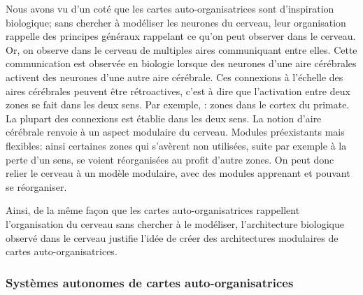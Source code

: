 \documentclass[../main]{subfiles}
\begin{document}
Nous avons vu d'un coté que les cartes auto-organisatrices sont d'inspiration biologique; sans chercher à modéliser les neurones du cerveau, leur organisation rappelle des principes généraux rappelant ce qu'on peut observer dans le cerveau. 
Or, on observe dans le cerveau de multiples aires communiquant entre elles. 
Cette communication est observée en biologie lorsque des neurones d'une aire cérébrales activent des neurones d'une autre aire cérébrale. 
Ces connexions à l'échelle des aires cérébrales peuvent être rétroactives, c'est à dire que l'activation entre deux zones se fait dans les deux sens. Par exemple, \cite{primate_cortex_91}: zones dans le cortex du primate. La plupart des connexions est établie dans les deux sens.
La notion d'aire cérébrale renvoie à un aspect modulaire du cerveau. Modules préexistants mais flexibles: ainsi certaines zones qui s'avèrent non utilisées, suite par exemple à la perte d'un sens, se voient réorganisées au profit d'autre zones. On peut donc relier le cerveau à un modèle modulaire, avec des modules apprenant et pouvant se réorganiser.

Ainsi, de la même façon que les cartes auto-organisatrices rappellent l'organisation du cerveau sans chercher à le modéliser, l'architecture biologique observé dans le cerveau justifie l'idée de créer des architectures modulaires de cartes auto-organisatrices.



\subsubsection{Systèmes autonomes de cartes auto-organisatrices}
\end{document}
